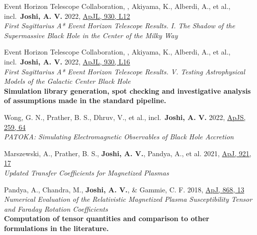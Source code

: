 \documentclass[11pt]{article}
\begin{document}
\begin{etaremune}
    \item Event Horizon Telescope Collaboration, , Akiyama, K., Alberdi, A., et al., incl.\ \textbf{Joshi, A. V.} 2022, \href{https://ui.adsabs.harvard.edu/abs/2022ApJ...930L..12E}{ApJL, 930, L12}\\\textit{First Sagittarius A* Event Horizon Telescope Results. I. The Shadow of the Supermassive Black Hole in the Center of the Milky Way}

    \item Event Horizon Telescope Collaboration, , Akiyama, K., Alberdi, A., et al., incl.\ \textbf{Joshi, A. V.} 2022, \href{https://ui.adsabs.harvard.edu/abs/2022ApJ...930L..16E}{ApJL, 930, L16}\\\textit{First Sagittarius A* Event Horizon Telescope Results. V. Testing Astrophysical Models of the Galactic Center Black Hole}\\\textbf{Simulation library generation, spot checking and investigative analysis of assumptions made in the standard pipeline.}

    \item Wong, G. N., Prather, B. S., Dhruv, V., et al., incl.\ \textbf{Joshi, A. V.} 2022, \href{https://ui.adsabs.harvard.edu/abs/2022ApJS..259...64W}{ApJS, 259, 64}\\\textit{PATOKA\@: Simulating Electromagnetic Observables of Black Hole Accretion}

    \item Marszewski, A., Prather, B. S., \textbf{Joshi, A. V.}, Pandya, A., et al. 2021, \href{https://ui.adsabs.harvard.edu/abs/2021ApJ...921...17M}{ApJ, 921, 17}\\\textit{Updated Transfer Coefficients for Magnetized Plasmas}

    \item Pandya, A., Chandra, M., \textbf{Joshi, A. V.}, \& Gammie, C. F. 2018, \href{https://ui.adsabs.harvard.edu/abs/2018ApJ...868...13P}{ApJ, 868, 13}\\\textit{Numerical Evaluation of the Relativistic Magnetized Plasma Susceptibility Tensor and Faraday Rotation Coefficients}\\\textbf{Computation of tensor quantities and comparison to other formulations in the literature.}

\end{etaremune}
\end{document}
